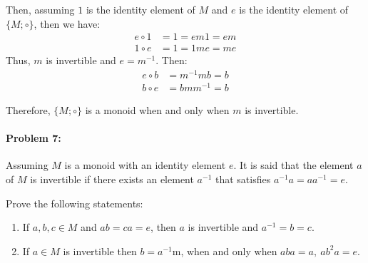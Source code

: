 \documentclass[12pt]{scrartcl}
\begin{document}
{{{\begin{minipage}{36.5em}
Then, assuming $1$ is the identity element of $M$ and $e$ is the identity element of $\{M; \circ \}$, then we have:
\begin{align*}
e \circ 1 &= 1 = em1 = em \\
1 \circ e &= 1 = 1me = me 
\end{align*}
Thus, $m$ is invertible and $e = m^{-1}$. Then: 
\begin{align*}
e \circ b &= m^{-1}mb = b \\
b \circ e &= bmm^{-1} = b 
\end{align*}

Therefore, $\{M; \circ\}$ is a monoid when and only when $m$ is invertible.
\end{minipage}}

\newpage

\paragraph*{Problem 7:} \begin{spacing}{1.2}Assuming $M$ is a monoid with an identity element $e$. It is said that the element $a$ of $M$ is invertible if there exists an element $a^{-1}$ that satisfies $a^{-1} a = a a^{-1} = e.$\\ \end{spacing}

Prove the following statements: 

\begin{enumerate}[label=\arabic*)]

\item If $a,b,c \in M$ and $ab=ca=e$, then $a$ is invertible and $a^{-1} = b= c$. 


	\vspace{0.5em}
\item If $a \in M$ is invertible then $b = a^{-1}$m, when and only when $aba=a, ~ ab^2a=e$.

\end{enumerate}}}
\end{document}
